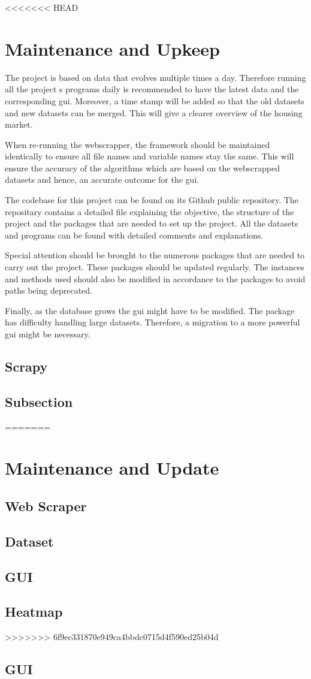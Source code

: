 \documentclass[main]{subfiles}
\begin{document}
<<<<<<< HEAD
\section{Maintenance and Upkeep}
The project is based on data that evolves multiple times a day. 
Therefore running all the project s programs daily is recommended to have the latest data and the corresponding \ac{gui}. 
Moreover, a time stamp will be added so that the old datasets and new datasets can be merged. 
This will give a clearer overview of the housing market. \par
When re-running the webscrapper, the framework should be maintained identically to ensure all file names and variable names stay the same. 
This will ensure the accuracy of the algorithms which are based on the webscrapped datasets and hence, an accurate outcome for the \ac{gui}. \par
The codebase for this project can be found on its Github public repository. 
The repositary contains a detailed \pkg[readme.md] file explaining the objective, the structure of the project and the packages that are needed to set up the project. 
All the datasets and programs can be found with detailed comments and explanations.\par
Special attention should be brought to the numerous packages that are needed to carry out the project. 
These packages should be updated regularly. The instances and methods used should also be modified in accordance to the packages to avoid paths being deprecated.\par
Finally, as the database grows the \ac{gui} might have to be modified. The \pkg[tkinter] package has difficulty handling large datasets.
Therefore, a migration to a more powerful \ac{gui} might be necessary.

\subsection{Scrapy}
\subsection{Subsection}
=======
\section{Maintenance and Update}
\subsection{Web Scraper}


\subsection{Dataset}

\subsection{GUI}

\subsection{Heatmap}
>>>>>>> 6f9ec331870e949ca4bbdc0715d4f590ed25b04d

\subsection{GUI}
\end{document}
